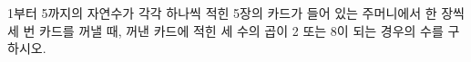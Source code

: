 1부터 5까지의 자연수가 각각 하나씩 적힌 5장의 카드가 들어 있는 주머니에서 한 장씩 세 번 카드를 꺼낼 때, 꺼낸 카드에 적힌 세 수의 곱이 2 또는 8이 되는 경우의 수를 구하시오. 
